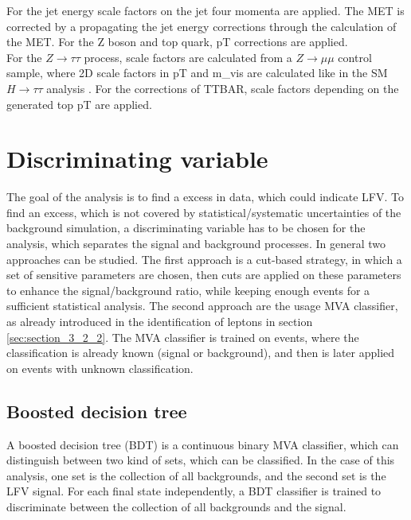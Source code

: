 For the jet energy scale factors on the jet four momenta are applied. The \gls{MET} is corrected by a propagating the jet energy corrections through the calculation of the MET. For the Z boson and top quark, \gls{pT} corrections are applied. \\

For the $Z\to\tau\tau$ process, scale factors are calculated from a $Z\to\mu\mu$ control sample, where 2D scale factors in \gls{pT} and \gls{m_vis} are calculated like in the SM $H\to\tau\tau$ analysis \cite{SMHTT}. For the corrections of \gls{TTBAR}, scale factors depending on the generated top \gls{pT} are applied.


\section{Discriminating variable}
\label{sec:section_3_5}

The goal of the analysis is to find a excess in data, which could indicate \gls{LFV}. To find an excess, which is not covered by statistical/systematic uncertainties of the background simulation, a discriminating variable has to be chosen for the analysis, which separates the signal and background processes. In general two approaches can be studied. The first approach is a cut-based strategy, in which a set of sensitive parameters are chosen, then cuts are applied on these parameters to enhance the signal/background ratio, while keeping enough events for a sufficient statistical analysis. The second approach are the usage \gls{MVA} classifier, as already introduced in the identification of leptons in section \ref{sec:section_3_2_2}. The \gls{MVA} classifier is trained on events, where the classification is already known (signal or background), and then is later applied on events with unknown classification. 

\subsection{Boosted decision tree}
\label{sec:section_3_5_1}

A boosted decision tree (\gls{BDT}) \cite{BDT} is a continuous binary \gls{MVA} classifier, which can distinguish between two kind of sets, which can be classified. In the case of this analysis, one set is the collection of all backgrounds, and the second set is the \gls{LFV} signal. For each final state independently, a \gls{BDT} classifier is trained to discriminate between the collection of all backgrounds and the signal. \\


